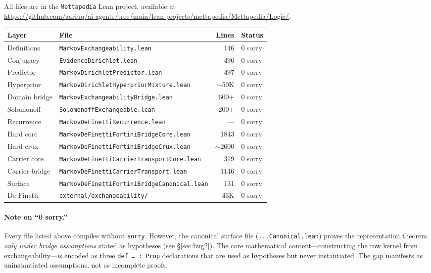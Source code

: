 \documentclass[11pt]{article}
\theoremstyle{definition}
\newcommand{\lean}[1]{\texttt{#1}}
\begin{document}
All files are in the \texttt{Mettapedia} Lean project, available at\\
\url{https://github.com/zariuq/ai-agents/tree/main/lean-projects/mettapedia/Mettapedia/Logic/}.

\begin{center}
\small
\begin{tabular}{llrl}
\hline
\textbf{Layer} & \textbf{File} & \textbf{Lines} & \textbf{Status} \\
\hline
Definitions & \texttt{MarkovExchangeability.lean} & 146 & {\color{provedgreen}0 sorry} \\
Conjugacy & \texttt{EvidenceDirichlet.lean} & 496 & {\color{provedgreen}0 sorry} \\
Predictor & \texttt{MarkovDirichletPredictor.lean} & 497 & {\color{provedgreen}0 sorry} \\
Hyperprior & \texttt{MarkovDirichletHyperpriorMixture.lean} & $\sim$50K & {\color{provedgreen}0 sorry} \\
Domain bridge & \texttt{MarkovExchangeabilityBridge.lean} & 600+ & {\color{provedgreen}0 sorry} \\
Solomonoff & \texttt{SolomonoffExchangeable.lean} & 200+ & {\color{provedgreen}0 sorry} \\
Recurrence & \texttt{MarkovDeFinettiRecurrence.lean} & --- & {\color{provedgreen}0 sorry} \\
Hard core & \texttt{MarkovDeFinettiFortiniBridgeCore.lean} & 1843 & {\color{provedgreen}0 sorry} \\
Hard crux & \texttt{MarkovDeFinettiFortiniBridgeCrux.lean} & $\sim$2600 & {\color{provedgreen}0 sorry} \\
Carrier core & \texttt{MarkovDeFinettiCarrierTransportCore.lean} & 319 & {\color{provedgreen}0 sorry} \\
Carrier bridge & \texttt{MarkovDeFinettiCarrierTransport.lean} & 1146 & {\color{provedgreen}0 sorry} \\
Surface & \texttt{MarkovDeFinettiFortiniBridgeCanonical.lean} & 131 & {\color{provedgreen}0 sorry} \\
\hline
De Finetti & \texttt{external/exchangeability/} & 43K & {\color{provedgreen}0 sorry} \\
\hline
\end{tabular}
\end{center}

\paragraph{Note on ``0 sorry.''}
Every file listed above compiles without \texttt{sorry}.  However, the
canonical surface file (\texttt{...Canonical.lean}) proves the
representation theorem \emph{only under bridge assumptions}
stated as hypotheses (see \S\ref{sec:bug2}).  The core mathematical
content---constructing the row kernel from exchangeability---is
encoded as three \lean{def \ldots\ : Prop} declarations that are
used as hypotheses but never instantiated.  The gap manifests as
uninstantiated assumptions, not as incomplete proofs.
\end{document}
